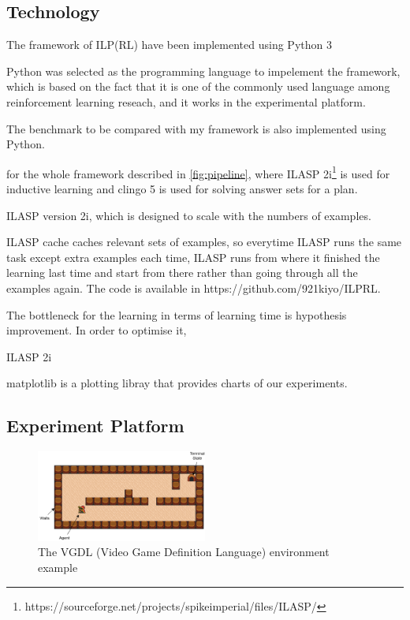 
\subsection{Technology}
The framework of ILP(RL) have been implemented using Python 3

Python was selected as the programming language to impelement the framework, which is based on the fact that it is one of the commonly used language among reinforcement learning reseach, 
and it works in the experimental platform. 

The benchmark to be compared with my framework is also implemented using Python.

for the whole framework described in \ref{fig:pipeline}, where ILASP 2i\footnote{https://sourceforge.net/projects/spikeimperial/files/ILASP/} is used for inductive learning and clingo 5 is used for solving answer sets for a plan.

ILASP version 2i, which is designed to scale with the numbers of examples.

ILASP cache caches relevant sets of examples, so everytime ILASP runs the same task except extra examples each time, ILASP runs from where it finished the learning last time and start from there rather than going through all the examples again.
The code is available in https://github.com/921kiyo/ILPRL.

The bottleneck for the learning in terms of learning time is hypothesis improvement. In order to optimise it,

ILASP 2i

matplotlib is a plotting libray that provides charts of our experiments.


\subsection{Experiment Platform}

\begin{figure}[!ht!b]
\centering
\includegraphics[width=0.5\textwidth]{./figures/env_sample}
\caption{The VGDL (Video Game Definition Language) environment example} 
\label{VGDL_sample}
\end{figure}

